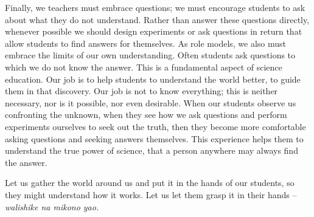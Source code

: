 Finally, we teachers must embrace questions; we must encourage students to ask about what they do not understand. Rather than answer these questions directly, whenever possible we should design experiments or ask questions in return that allow students to find answers for themselves. As role models, we also must embrace the limits of our own understanding. Often students ask questions to which we do not know the answer. This is a fundamental aspect of science education. Our job is to help students to understand the world better, to guide them in that discovery. Our job is not to know everything; this is neither necessary, nor is it possible, nor even desirable. When our students observe us confronting the unknown, when they see how we ask questions and perform experiments ourselves to seek out the truth, then they become more comfortable asking questions and seeking answers themselves. This experience helps them to understand the true power of science, that a person anywhere may always find the answer.

Let us gather the world around us and put it in the hands of our students, so they might understand how it works. Let us let them grasp it in their hands -- \textit{walishike na mikono yao.}
